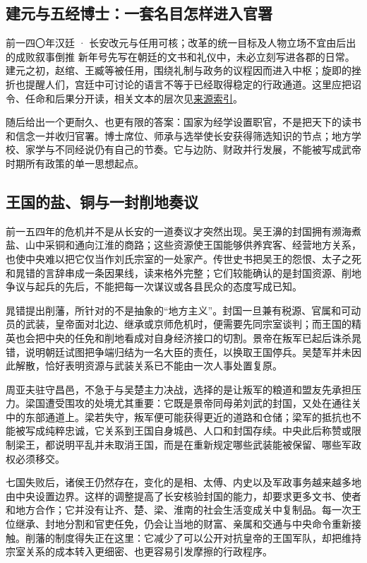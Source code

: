 \subsection{建元与五经博士：一套名目怎样进入官署}
\begin{event}{}{前一四〇年}{汉廷 · 长安}{改元与任用可核；改革的统一目标及人物立场不宜由后出的成败叙事倒推}
新年号先写在朝廷的文书和礼仪中，未必立刻写进各郡的日常。建元之初，赵绾、王臧等被任用，围绕礼制与政务的议程因而进入中枢；旋即的挫折也提醒人们，宫廷中可讨论的语言不等于已经取得稳定的行政通道。这里应把诏令、任命和后果分开读，相关文本的层次见\hyperref[app:sources]{来源索引}。

随后给出一个更耐久、也更有限的答案：国家为经学设置职官，不是把天下的读书和信念一并收归官署。博士席位、师承与选举使长安获得筛选知识的节点；地方学校、家学与不同经说仍有自己的节奏。它与边防、财政并行发展，不能被写成武帝时期所有政策的单一思想起点。
\end{event}

\subsection{王国的盐、铜与一封削地奏议}

前一五四年的危机并不是从长安的一道奏议才突然出现。吴王濞的封国拥有濒海煮盐、山中采铜和通向江淮的商路；这些资源使王国能够供养宾客、经营地方关系，也使中央难以把它仅当作刘氏宗室的一处家产。传世史书把吴王的怨恨、太子之死和晁错的言辞串成一条因果线，读来格外完整；它们较能确认的是封国资源、削地争议与起兵的先后，不能把每一次谋议或各县民众的态度写成已知。

晁错提出削藩，所针对的不是抽象的“地方主义”。封国一旦兼有税源、官属和可动员的武装，皇帝面对北边、继承或京师危机时，便需要先同宗室谈判；而王国的精英也会把中央的任免和削地看成对自身经济接口的切割。景帝在叛军已起后诛杀晁错，说明朝廷试图把争端归结为一名大臣的责任，以换取王国停兵。吴楚军并未因此解散，恰好表明资源与武装关系已不能由一次人事处置复原。

周亚夫驻守昌邑，不急于与吴楚主力决战，选择的是让叛军的粮道和盟友先承担压力。梁国遭受围攻的处境尤其重要：它既是景帝同母弟刘武的封国，又处在通往关中的东部通道上。梁若失守，叛军便可能获得更近的道路和仓储；梁军的抵抗也不能被写成纯粹忠诚，它关系到王国自身城邑、人口和封国存续。中央此后称赞或限制梁王，都说明平乱并未取消王国，而是在重新规定哪些武装能被保留、哪些军政权必须移交。

七国失败后，诸侯王仍然存在，变化的是相、太傅、内史以及军政事务越来越多地由中央设置边界。这样的调整提高了长安核验封国的能力，却要求更多文书、使者和地方合作；它并没有让齐、楚、梁、淮南的社会生活变成关中复制品。每一次王位继承、封地分割和官吏任免，仍会让当地的财富、亲属和交通与中央命令重新接触。削藩的制度得失正在这里：它减少了可以公开对抗皇帝的王国军队，却把维持宗室关系的成本转入更细密、也更容易引发摩擦的行政程序。

